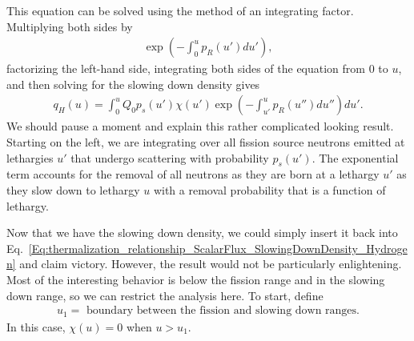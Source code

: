 This equation can be solved using the method of an integrating factor. Multiplying both sides by
\begin{align}
  \exp\left( -\int_0^u p_R(u') du' \right) , \nonumber
\end{align}
factorizing the left-hand side, integrating both sides of the equation from 0 to $u$, and then solving for the slowing down density gives
\begin{align}
  q_H(u) = \int_0^u Q_0 p_s(u') \chi(u') \exp\left( -\int_{u'}^u p_R(u'') du'' \right) du' . \label{Eq:thermalization_slowingDownDensity_Hydrogen_GeneralForm}
\end{align}
We should pause a moment and explain this rather complicated looking result. Starting on the left, we are integrating over all fission source neutrons emitted at lethargies $u'$ that undergo scattering with probability $p_s(u')$. The exponential term accounts for the removal of all neutrons as they are born at a lethargy $u'$ as they slow down to lethargy $u$ with a removal probability that is a function of lethargy.

Now that we have the slowing down density, we could simply insert it back into Eq.~\eqref{Eq:thermalization_relationship_ScalarFlux_SlowingDownDensity_Hydrogen} and claim victory. However, the result would not be particularly enlightening. Most of the interesting behavior is below the fission range and in the slowing down range, so we can restrict the analysis here. To start, define
\begin{align}
  u_1 = \text{ boundary between the fission and slowing down ranges.} \nonumber
\end{align}
In this case, $\chi(u) = 0$ when $u > u_1$. 

